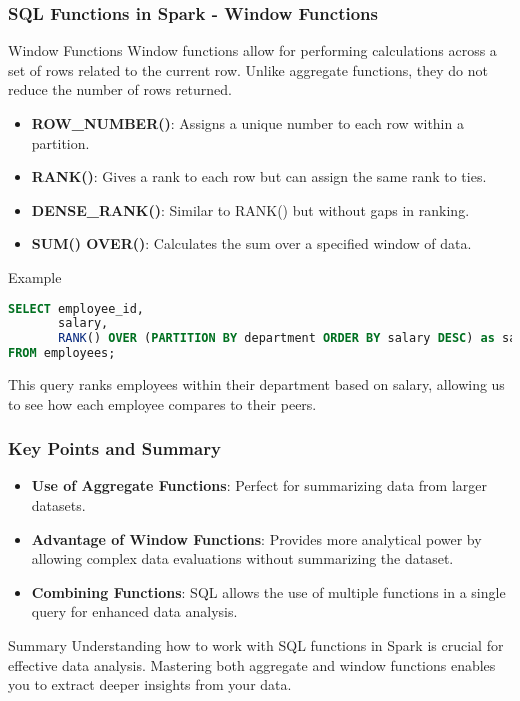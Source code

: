 \documentclass[aspectratio=169]{beamer}
\begin{document}
\begin{frame}
    \frametitle{SQL Functions in Spark - Window Functions}
    \begin{block}{Window Functions}
        Window functions allow for performing calculations across a set of rows related to the current row. Unlike aggregate functions, they do not reduce the number of rows returned.
    \end{block}
    \begin{itemize}
        \item \textbf{ROW\_NUMBER()}: Assigns a unique number to each row within a partition.
        \item \textbf{RANK()}: Gives a rank to each row but can assign the same rank to ties.
        \item \textbf{DENSE\_RANK()}: Similar to RANK() but without gaps in ranking.
        \item \textbf{SUM() OVER()}: Calculates the sum over a specified window of data.
    \end{itemize}
    \begin{block}{Example}
        \begin{lstlisting}[language=SQL]
SELECT employee_id, 
       salary, 
       RANK() OVER (PARTITION BY department ORDER BY salary DESC) as salary_rank 
FROM employees;
        \end{lstlisting}
    \end{block}
    This query ranks employees within their department based on salary, allowing us to see how each employee compares to their peers.
\end{frame}

\begin{frame}
    \frametitle{Key Points and Summary}
    \begin{itemize}
        \item \textbf{Use of Aggregate Functions}: Perfect for summarizing data from larger datasets.
        \item \textbf{Advantage of Window Functions}: Provides more analytical power by allowing complex data evaluations without summarizing the dataset.
        \item \textbf{Combining Functions}: SQL allows the use of multiple functions in a single query for enhanced data analysis.
    \end{itemize}
    \begin{block}{Summary}
        Understanding how to work with SQL functions in Spark is crucial for effective data analysis. Mastering both aggregate and window functions enables you to extract deeper insights from your data.
    \end{block}
\end{frame}
\end{document}
